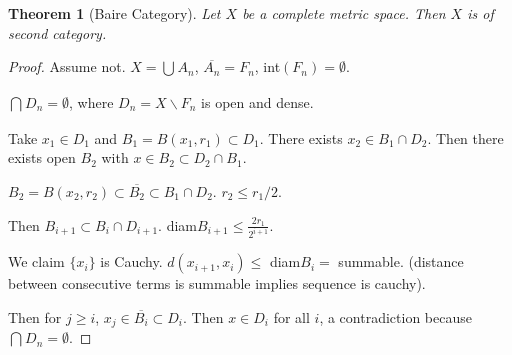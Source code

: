 \documentclass[11pt]{article}
\newtheorem{thm}{Theorem}[section]
\newcommand{\ov}[1]{\overline{#1}}
\newcommand{\sbs}{\subset}
\newcommand{\bs}{\backslash}
\newcommand{\es}{\emptyset}
\newcommand{\bca}[2]{\bigcap_{#1}^{#2}}
\newcommand{\bcu}[2]{\bigcup_{#1}^{#2}}
\newcommand{\fr}[2]{\frac{#1}{#2}}
\begin{document}
\begin{thm}[Baire Category]
Let $X$ be a complete metric space. Then $X$ is of second category.
\end{thm}
\begin{proof}
Assume not. $X=\bcu{}{}A_n$, $\ov{A_n}=F_n$, int$(F_n)=\es$. 

$\bca{}{}D_n=\es$, where $D_n=X\bs F_n$ is open and dense. 

Take $x_1\in D_1$ and $B_1=B(x_1,r_1)\sbs D_1$. There exists $x_2\in B_1\cap D_2$. Then there exists open $B_2$ with $x\in B_2 \sbs D_2\cap B_1$. 

$B_2=B(x_2,r_2)\sbs\ov{B_2}\sbs B_1\cap D_2$. $r_2\le r_1/2$. 

Then $B_{i+1}\sbs B_i\cap D_{i+1}$. diam$B_{i+1}\le\fr{2r_1}{2^{i+1}}$. 

We claim $\{x_i\}$ is Cauchy. $d(x_{i+1},x_i)\le$ diam$B_i=$ summable. (distance between consecutive terms is summable implies sequence is cauchy). 

Then for $j\ge i$, $x_j\in\ov{B_i}\sbs D_i$. Then $x\in D_i$ for all $i$, a contradiction because $\bca{}{} D_n=\es$. 


\end{proof}
\end{document}
